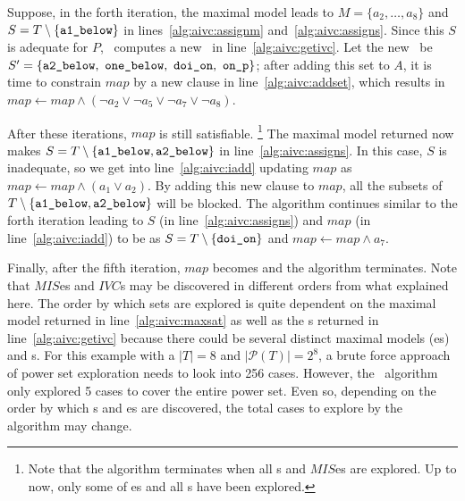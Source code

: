 Suppose, in the forth iteration, the maximal model leads to $M = \{a_2, \ldots, a_8\}$ and
$S = T \setminus \{ {\small \texttt{a1\_below}}\} $ in lines~\ref{alg:aivc:assignm} and~\ref{alg:aivc:assigns}.
Since this $S$ is adequate for $P$, \getivc ~computes a new \mivc\ in line~\ref{alg:aivc:getivc}.
Let the new \mivc\ be $S' = \{ {\small \texttt{a2\_below},~\texttt{one\_below}, ~\texttt{doi\_on},~\texttt{on\_p}}\}$; after adding this set to $A$,
it is time to constrain $map$ by a new clause in line~\ref{alg:aivc:addset},
which results in $map \leftarrow map \wedge (\neg a_2 \vee \neg a_5 \vee \neg a_7 \vee \neg a_8)$.

After these iterations, $map$
is still satisfiable.
\footnote{Note that the algorithm terminates when all \mivc s and $MIS$es are explored. Up to now, only some of \mis es and all \mivc s have been explored.}
 The maximal model returned now makes
 $S = T \setminus \{ { \small \texttt{a1\_below}}, { \small \texttt{a2\_below}}\}$ in line~\ref{alg:aivc:assigns}.
In this case, $S$ is inadequate, so we get into line~\ref{alg:aivc:iadd} updating $map$ as
$map \leftarrow map \wedge (a_1 \vee a_2)$. By adding this new clause to $map$,
all the subsets of $T \setminus \{ { \small \texttt{a1\_below}}, {\small \texttt{a2\_below}}\}$
will be blocked. The algorithm continues similar to the forth iteration leading to $S$ (in line~\ref{alg:aivc:assigns}) and $map$ (in line~\ref{alg:aivc:iadd}) to be as
 $S = T \setminus \{ {\small  \texttt{doi\_on}}\}$ and $map \leftarrow map \wedge a_7$.

Finally, after the fifth iteration, $map$ becomes \unsat and the algorithm terminates.
Note that $MIS$es and $IVC$s may be discovered in different orders from what explained here. The order by which sets are explored is
quite dependent on the maximal model returned in line~\ref{alg:aivc:maxsat} as well as the \mivc s returned in line~\ref{alg:aivc:getivc} because there could be several distinct maximal models (\mis es) and \mivc s. For this example with a $|T| = 8$ and $|\mathcal{P}(T)| = 2^8$, a brute force approach of power set exploration needs to look into  256 cases. However, the \aivcalg ~algorithm only explored 5 cases to cover the entire power set. Even so, depending on the order by which \mivc s and \mis es are discovered, the total cases to explore by the algorithm may change.

